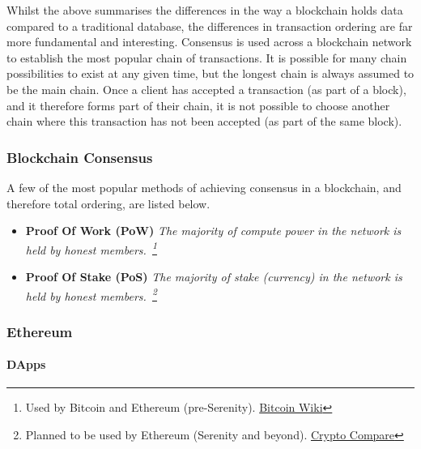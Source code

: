 Whilst the above summarises the differences in the way a blockchain holds data compared to a traditional database, the differences in transaction ordering are far more fundamental and interesting. Consensus is used across a blockchain network to establish the most popular chain of transactions. It is possible for many chain possibilities to exist at any given time, but the longest chain is always assumed to be the main chain. Once a client has accepted a transaction (as part of a block), and it therefore forms part of their chain, it is not possible to choose another chain where this transaction has not been accepted (as part of the same block).

\subsubsection{Blockchain Consensus}

A few of the most popular methods of achieving consensus in a blockchain, and therefore total ordering, are listed below.

\begin{itemize}
  \item
    \textbf{Proof Of Work (PoW)}
    \textit{The majority of compute power in the network is held by honest members.~\footnote{Used by Bitcoin and Ethereum (pre-Serenity). \href{https://en.bitcoin.it/wiki/Proof_of_work}{Bitcoin Wiki}}}
  \item
    \textbf{Proof Of Stake (PoS)}
    \textit{The majority of stake (currency) in the network is held by honest members.~\footnote{Planned to be used by Ethereum (Serenity and beyond). \href{https://www.cryptocompare.com/coins/guides/the-ethereum-releases-of-frontier-homestead-metropolis-and-serenity/}{Crypto Compare}}}
\end{itemize}

\subsubsection{Ethereum}

\paragraph{DApps}





